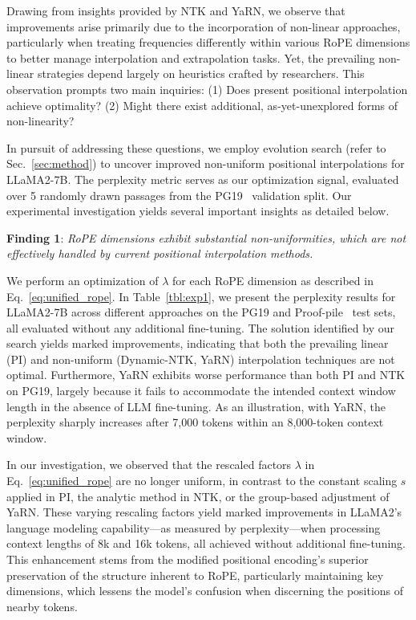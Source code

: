Drawing from insights provided by NTK and YaRN, we observe that improvements arise primarily due to the incorporation of non-linear approaches, particularly when treating frequencies differently within various RoPE dimensions to better manage interpolation and extrapolation tasks. Yet, the prevailing non-linear strategies depend largely on heuristics crafted by researchers. This observation prompts two main inquiries: (1) Does present positional interpolation achieve optimality? (2) Might there exist additional, as-yet-unexplored forms of non-linearity?

In pursuit of addressing these questions, we employ evolution search (refer to Sec.~\ref{sec:method}) to uncover improved non-uniform positional interpolations for LLaMA2-7B. The perplexity metric serves as our optimization signal, evaluated over 5 randomly drawn passages from the PG19~\cite{pg19} validation split. Our experimental investigation yields several important insights as detailed below.

\textbf{Finding 1}: \textit{RoPE dimensions exhibit substantial non-uniformities, which are not effectively handled by current positional interpolation methods.}

We perform an optimization of $\lambda$ for each RoPE dimension as described in Eq.~\ref{eq:unified_rope}. In Table~\ref{tbl:exp1}, we present the perplexity results for LLaMA2-7B across different approaches on the PG19 and Proof-pile~\cite{proof-pile} test sets, all evaluated without any additional fine-tuning. The solution identified by our search yields marked improvements, indicating that both the prevailing linear (PI) and non-uniform (Dynamic-NTK, YaRN) interpolation techniques are not optimal. Furthermore, YaRN exhibits worse performance than both PI and NTK on PG19, largely because it fails to accommodate the intended context window length in the absence of LLM fine-tuning. As an illustration, with YaRN, the perplexity sharply increases after 7,000 tokens within an 8,000-token context window.

In our investigation, we observed that the rescaled factors $\lambda$ in Eq.~\ref{eq:unified_rope} are no longer uniform, in contrast to the constant scaling $s$ applied in PI, the analytic method in NTK, or the group-based adjustment of YaRN. These varying rescaling factors yield marked improvements in LLaMA2's language modeling capability—as measured by perplexity—when processing context lengths of 8k and 16k tokens, all achieved without additional fine-tuning. This enhancement stems from the modified positional encoding's superior preservation of the structure inherent to RoPE, particularly maintaining key dimensions, which lessens the model's confusion when discerning the positions of nearby tokens.

